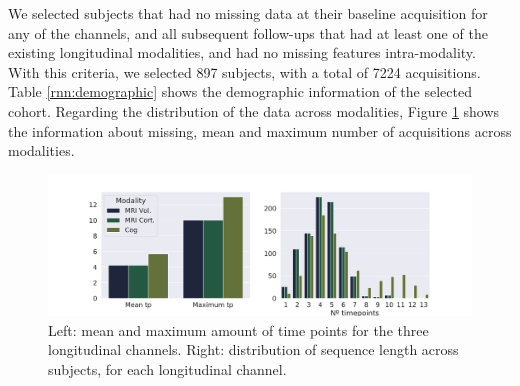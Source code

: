 We selected subjects that had no missing data at their baseline acquisition for any of the channels, and all subsequent follow-ups that had at least one of the existing longitudinal modalities, and had no missing features intra-modality. With this criteria, we selected 897 subjects, with a total of 7224 acquisitions. Table \ref{rnn:demographic} shows the demographic information of the selected cohort. Regarding the distribution of the data across modalities, Figure \ref{fig:rnn:missingdata} shows the information about missing, mean and maximum number of acquisitions across modalities. \\

\begin{table}[!htbp]
\centering
{}
\caption[Demographic characteristics of the cohort used, at baseline.]{Demographic characteristics of the cohort at baseline. Age and education presented as average and standard deviation, in years. APOE $\varepsilon$4: Apolipoprotein $\varepsilon$4, percentage with 1 or 2 alleles. CN: Cognitively normal. MCI: Mild cognitive impairment. AD: Alzheimer’s disease. MMSE: Mini-mental state examination. }\label{rnn:demographic}
\end{table}

\begin{figure}[!htbp]
  \centering
  \includegraphics[width=1.0\textwidth]{figures/rnnvae/rnn_long.pdf}
  \caption[Time point distribution of ADNI data.]{Left: mean and maximum amount of time points for the three longitudinal channels. Right: distribution of sequence length across subjects, for each longitudinal channel.}\label{fig:rnn:missingdata}
\end{figure}

